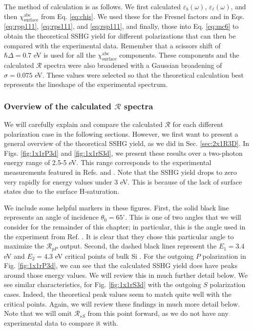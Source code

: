 The method of calculation is as follows. We first calculated
$\varepsilon_{b}(\omega)$, $\varepsilon_{\ell}(\omega)$, and then
$\chi^{\mathrm{abc}}_{\mathrm{surface}}$ from Eq. \eqref{eq:chis}. We used these
for the Fresnel factors and in Eqs. \eqref{eq:rpp111}, \eqref{eq:rps111}, and
\eqref{eq:rsp111}, and finally, those into Eq. \eqref{eq:mc6} to obtain the
theoretical SSHG yield for different polarizations that can then be compared
with the experimental data. Remember that a scissors shift of $\hbar\Delta =
0.7$ eV is used for all the $\chi^{\mathrm{abc}}_{\mathrm{surface}}$ components.
These components and the calculated ${\mathcal{R}}$ spectra were also broadened
with a Gaussian broadening of $\sigma=0.075$ eV. These values were selected so
that the theoretical calculation best represents the lineshape of the
experimental spectrum.



\subsubsection{Overview of the calculated \texorpdfstring{$\mathcal{R}$}{R}
spectra}\label{sec:1x1R3D}

We will carefully explain and compare the calculated $\mathcal{R}$ for each
different polarization case in the following sections. However, we first want to
present a general overview of the theoretical SSHG yield, as we did in Sec.
\ref{sec:2x1R3D}. In Figs. \ref{fig:1x1rP3d} and \ref{fig:1x1rS3d}, we present
these results over a two-photon energy range of 2.5-5 eV. This range corresponds
to the experimental measurements featured in Refs. \cite{mejiaPRB02} and
\cite{bergfeldPRL04}. Note that the SSHG yield drops to zero very rapidly
for energy values under 3 eV. This is because of the lack of surface states due
to the surface H-saturation.

We include some helpful markers in these figures. First, the solid black line
represents an angle of incidence $\theta_{0} = 65^{\circ}$. This is one of two
angles that we will consider for the remainder of this chapter; in particular,
this is the angle used in the experiment from Ref.
\cite{mejiaPRB02}. It is clear that they chose this particular angle to maximize
the $\mathcal{R}_{pP}$ output. Second, the dashed black lines represent the
$E_{1} = 3.4$ eV and $E_{2} = 4.3$ eV critical points of bulk Si
\cite{yubook}. For the outgoing $P$ polarization in Fig. \ref{fig:1x1rP3d}, we
can see that the calculated SSHG yield does have peaks around those energy
values. We will review this in much further detail below. We see similar
characteristics, for Fig. \ref{fig:1x1rS3d} with the outgoing $S$ polarization
cases. Indeed, the theoretical peak values seem to match quite well with the
critical points. Again, we will review these findings in much more detail below.
Note that we will omit $\mathcal{R}_{sS}$ from this point forward, as we do not
have any experimental data to compare it with.

